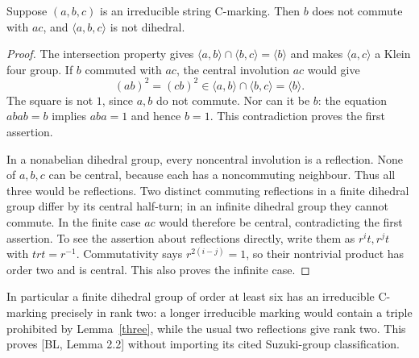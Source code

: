 \documentclass[a4paper,11pt]{article}
\newcommand{\gen}[1]{\langle#1\rangle}
\begin{document}
\begin{lemma}\label{three}
Suppose $(a,b,c)$ is an irreducible string C-marking. Then $b$ does not
commute with $ac$, and $\gen{a,b,c}$ is not dihedral.
\end{lemma}
\begin{proof}
The intersection property gives
$\gen{a,b}\cap\gen{b,c}=\gen b$ and makes $\gen{a,c}$ a Klein four
group. If $b$ commuted with $ac$, the central involution $ac$ would give
\[
 (ab)^2=(cb)^2\in\gen{a,b}\cap\gen{b,c}=\gen b.
\]
The square is not $1$, since $a,b$ do not commute. Nor can it be $b$:
the equation $abab=b$ implies $aba=1$ and hence $b=1$. This contradiction
proves the first assertion.

In a nonabelian dihedral group, every noncentral involution is a reflection.
None of $a,b,c$ can be central, because each has a noncommuting neighbour.
Thus all three would be reflections. Two distinct commuting reflections
in a finite dihedral group differ by its central half-turn; in an infinite
dihedral group they cannot commute. In the finite case $ac$ would therefore
be central, contradicting the first assertion. To see the assertion about
reflections directly, write them as $r^i t,r^j t$ with $trt=r^{-1}$.
Commutativity says $r^{2(i-j)}=1$, so their nontrivial product has order two
and is central. This also proves the infinite case.
\end{proof}
In particular a finite dihedral group of order at least six has an
irreducible C-marking precisely in rank two: a longer irreducible marking
would contain a triple prohibited by Lemma~\ref{three}, while the usual two
reflections give rank two. This proves [BL, Lemma 2.2] without importing its
cited Suzuki-group classification.
\end{document}

